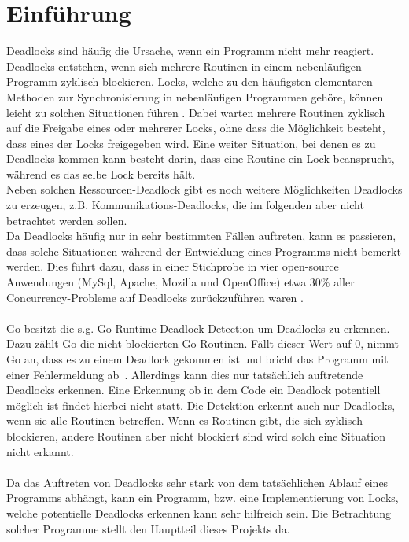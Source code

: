 \chapter{Einführung}
Deadlocks sind häufig die Ursache, wenn ein Programm nicht mehr reagiert\cite{Joshi}.
Deadlocks entstehen, wenn sich mehrere Routinen in einem nebenläufigen 
Programm zyklisch blockieren. Locks, welche zu den häufigsten elementaren 
Methoden zur Synchronisierung in nebenläufigen Programmen gehöre, können 
leicht zu solchen Situationen führen \cite{zhou}. Dabei warten mehrere Routinen 
zyklisch auf die Freigabe eines oder mehrerer Locks, ohne dass die Möglichkeit
besteht, dass eines der Locks freigegeben wird. Eine weiter Situation, 
bei denen es zu Deadlocks kommen kann besteht darin, dass eine Routine 
ein Lock beansprucht, während es das selbe Lock bereits hält.\\ 
Neben solchen Ressourcen-Deadlock gibt es noch weitere Möglichkeiten Deadlocks 
zu erzeugen, z.B. Kommunikations-Deadlocks, die im folgenden aber nicht betrachtet 
werden sollen. \\
Da Deadlocks häufig nur in sehr bestimmten Fällen auftreten, kann es passieren,
dass solche Situationen während der Entwicklung eines Programms nicht bemerkt
werden. Dies führt dazu, dass in einer Stichprobe in vier open-source Anwendungen 
(MySql, Apache, Mozilla und OpenOffice) etwa $30\%$ aller Concurrency-Probleme 
auf Deadlocks zurückzuführen waren \cite{Lu}.\\\\
Go besitzt die s.g. Go Runtime Deadlock Detection um Deadlocks zu erkennen. 
Dazu zählt Go die nicht blockierten Go-Routinen.
Fällt dieser Wert auf $0$, nimmt Go an, dass es zu einem Deadlock gekommen 
ist und bricht das Programm mit einer Fehlermeldung ab~\cite{grdd_code}.
Allerdings kann 
dies nur tatsächlich auftretende Deadlocks erkennen. Eine Erkennung ob 
in dem Code ein Deadlock potentiell möglich ist findet hierbei nicht statt. Die 
Detektion erkennt auch nur Deadlocks, wenn sie alle Routinen betreffen. 
Wenn es Routinen gibt, die sich zyklisch blockieren, andere Routinen aber 
nicht blockiert sind wird solch eine Situation nicht erkannt.\\\\
Da das Auftreten von Deadlocks sehr stark von dem tatsächlichen Ablauf eines 
Programms abhängt, kann ein Programm, bzw. eine Implementierung 
von Locks, welche potentielle Deadlocks erkennen kann sehr hilfreich sein.
Die Betrachtung solcher Programme stellt den Hauptteil dieses Projekts da.
